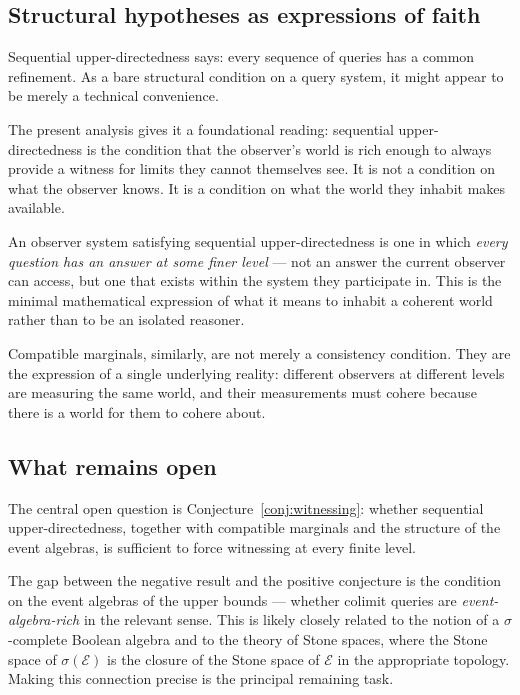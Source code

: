 \documentclass[12pt]{article}
\theoremstyle{definition}
\theoremstyle{remark}
\newcommand{\E}{\mathcal{E}}
\newcommand{\sigE}{\sigma(\mathcal{E})}
\begin{document}
\subsection{Structural hypotheses as expressions of faith}

Sequential upper-directedness says: every sequence of queries has a common
refinement.  As a bare structural condition on a query system, it might appear
to be merely a technical convenience.

The present analysis gives it a foundational reading: sequential upper-directedness
is the condition that the observer's world is rich enough to always provide a
witness for limits they cannot themselves see.  It is not a condition on what the
observer knows.  It is a condition on what the world they inhabit makes available.

An observer system satisfying sequential upper-directedness is one in which
\emph{every question has an answer at some finer level} --- not an answer the
current observer can access, but one that exists within the system they participate
in.  This is the minimal mathematical expression of what it means to inhabit a
coherent world rather than to be an isolated reasoner.

Compatible marginals, similarly, are not merely a consistency condition.  They are
the expression of a single underlying reality: different observers at different
levels are measuring the same world, and their measurements must cohere because
there is a world for them to cohere about.

\subsection{What remains open}

The central open question is Conjecture~\ref{conj:witnessing}: whether sequential
upper-directedness, together with compatible marginals and the structure of the
event algebras, is sufficient to force witnessing at every finite level.

The gap between the negative result and the positive conjecture is the condition
on the event algebras of the upper bounds --- whether colimit queries are
\emph{event-algebra-rich} in the relevant sense.  This is likely closely related
to the notion of a $\sigma$-complete Boolean algebra and to the theory of Stone
spaces, where the Stone space of $\sigE$ is the closure of the Stone space of
$\E$ in the appropriate topology.  Making this connection precise is the principal
remaining task.
\end{document}
